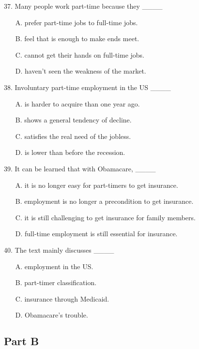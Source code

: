 \documentclass[UTF8,11pt]{ctexart}
\begin{document}
37. Many people work part-time because they \_\_\_\_


\begin{itemize}[leftmargin=2em,itemsep=.2em,topsep=.4em]\item[A.] prefer part-time jobs to full-time jobs.
\item[B.] feel that is enough to make ends meet.
\item[C.] cannot get their hands on full-time jobs.
\item[D.] haven’t seen the weakness of the market.
\end{itemize}

38. Involuntary part-time employment in the US \_\_\_\_


\begin{itemize}[leftmargin=2em,itemsep=.2em,topsep=.4em]\item[A.] is harder to acquire than one year ago.
\item[B.] shows a general tendency of decline.
\item[C.] satisfies the real need of the jobless.
\item[D.] is lower than before the recession.
\end{itemize}

39. It can be learned that with Obamacare, \_\_\_\_


\begin{itemize}[leftmargin=2em,itemsep=.2em,topsep=.4em]\item[A.] it is no longer easy for part-timers to get insurance.
\item[B.] employment is no longer a precondition to get insurance.
\item[C.] it is still challenging to get insurance for family members.
\item[D.] full-time employment is still essential for insurance.
\end{itemize}

40. The text mainly discusses \_\_\_\_


\begin{itemize}[leftmargin=2em,itemsep=.2em,topsep=.4em]\item[A.] employment in the US.
\item[B.] part-timer classification.
\item[C.] insurance through Medicaid.
\item[D.] Obamacare’s trouble.
\end{itemize}

\subsection*{\textbf{Part B}}
\end{document}
